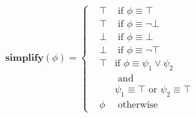 \documentclass[10pt,a4paper]{article}
\newcommand{\rp}[2]{\ensuremath{\langle #1, #2 \rangle}}
\newcommand{\res}[2]{\ensuremath{r_{#1}^{#2}}}
\begin{document}
\begin{align*}
\mathbf{simplify}(\phi) = \left\{
\begin{aligned}
&\top &\text{ if } \phi \equiv \top \\
&\top &\text{ if } \phi \equiv \neg \bot \\
&\bot &\text{ if } \phi \equiv \bot \\
&\bot &\text{ if } \phi \equiv \neg \top \\
&\top &\text {if } \phi \equiv \psi_1 \vee \psi_2 \\
& &\text{ and } \\ & & \psi_1 \equiv \top \text{ or } \psi_2 \equiv \top \\
&\phi &\text{ otherwise}
\end{aligned} \right. \\
\end{align*}


\end{document}
